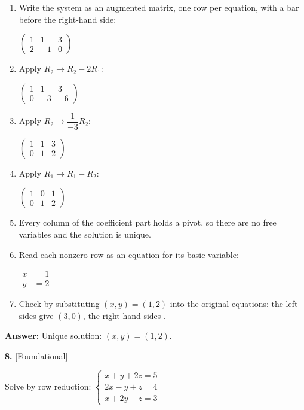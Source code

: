 \documentclass[11pt]{article}
\begin{document}
\begin{tcolorbox}[breakable,colback=ans,colframe=ansb,boxrule=0.5pt,left=4pt,right=4pt,top=2pt,bottom=2pt]\begin{enumerate}[leftmargin=2.2em,itemsep=1pt,topsep=1pt,label=\textbf{Step \arabic*.}]\item Write the system as an augmented matrix, one row per equation, with a bar before the right-hand side:\par\smallskip $\displaystyle \left(\begin{array}{cc|c}1 & 1 & 3 \\ 2 & -1 & 0\end{array}\right)$
\item Apply $R_2\to R_2-2R_1$:\par\smallskip $\displaystyle \left(\begin{array}{cc|c}1 & 1 & 3 \\ 0 & -3 & -6\end{array}\right)$
\item Apply $R_2\to \dfrac{1}{-3} R_2$:\par\smallskip $\displaystyle \left(\begin{array}{cc|c}1 & 1 & 3 \\ 0 & 1 & 2\end{array}\right)$
\item Apply $R_1\to R_1-R_2$:\par\smallskip $\displaystyle \left(\begin{array}{cc|c}1 & 0 & 1 \\ 0 & 1 & 2\end{array}\right)$
\item Every column of the coefficient part holds a pivot, so there are no free variables and the solution is unique.
\item Read each nonzero row as an equation for its basic variable:\par\smallskip $\displaystyle\begin{aligned}x&=1\\ y&=2\end{aligned}$
\item Check by substituting $(x,y)=(1,2)$ into the original equations: the left sides give $(3,0)$, the right-hand sides \checkmark.
\end{enumerate}\textbf{Answer:} Unique solution: $(x,y)=(1,2)$.\end{tcolorbox}
\par\vspace{2pt}
\begin{minipage}{\linewidth}\textbf{8.} \hfill{\scriptsize\color{ink}[Foundational]}\par\nopagebreak Solve by row reduction: $\begin{cases}x+y+2z=5\\ 2x-y+z=4\\ x+2y-z=3\end{cases}$
\end{minipage}\par\nopagebreak
\end{document}
